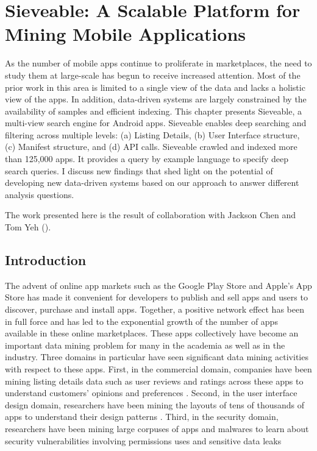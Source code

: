 \chapter{Sieveable: A Scalable Platform for Mining Mobile Applications}
\label{ch:sieveable_chapter}
As the number of mobile apps continue to proliferate in marketplaces, the need to study them at large-scale has begun to receive increased attention. 
Most of the prior work in this area is limited to a single view of the data  and lacks a  holistic view of the apps. 
In addition, data-driven systems are largely constrained by the availability of samples and efficient indexing.
This chapter presents Sieveable, a multi-view search engine for Android apps.
Sieveable enables deep searching and filtering across multiple levels: (a) Listing Details, (b) User Interface structure, (c) Manifest structure, and (d) API calls. 
Sieveable crawled and indexed more than 125,000 apps. 
It provides a query by example language to specify deep search queries. 
I discuss new findings that shed light on the potential of developing new data-driven systems based on our approach to answer different analysis questions.

The work presented here is the result of collaboration with Jackson Chen and Tom Yeh (\cite{Alharbi_2015_VLDB}).

\section{Introduction}

The advent of online app markets such as the Google Play Store and Apple's App Store has made it convenient for developers to publish and sell apps and users to discover, purchase and install apps. 
Together, a positive network effect has been in full force and has led to the exponential growth of the number of apps available in these online marketplaces.
These apps collectively have become an important data mining problem for many in the academia as well as in the industry.
Three domains in particular have seen significant data mining activities with respect to these apps.
First, in the commercial domain, companies have been mining listing details data such as user reviews and ratings across these apps to understand customers' opinions and preferences \cite{appbrain,apptrace}.
Second, in the user interface design domain, researchers have been mining the layouts of tens of thousands of apps to understand their design patterns \cite{Alharbi_2015_MobileHCI}.
Third, in the security domain, researchers have been mining large corpuses of apps and malwares to learn about security vulnerabilities involving permissions uses \cite{zhou_2012_SP_dissecting} and sensitive data leaks \cite{Arzt_2014_PLDI}

